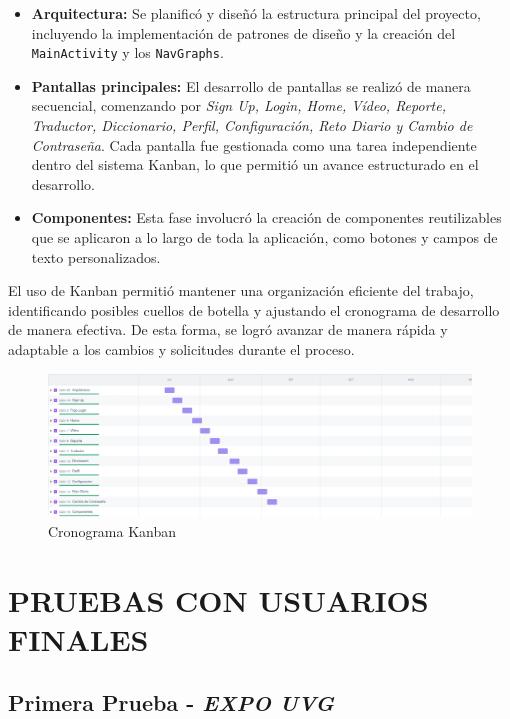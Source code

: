 \begin{itemize}
    \item \textbf{Arquitectura:} Se planificó y diseñó la estructura principal del proyecto, incluyendo la implementación de patrones de diseño y la creación del \texttt{MainActivity} y los \texttt{NavGraphs}.
    \item \textbf{Pantallas principales:} El desarrollo de pantallas se realizó de manera secuencial, comenzando por\textit{ Sign Up, Login, Home, Vídeo, Reporte, Traductor, Diccionario, Perfil, Configuración, Reto Diario y Cambio de Contraseña}. Cada pantalla fue gestionada como una tarea independiente dentro del sistema Kanban, lo que permitió un avance estructurado en el desarrollo.
    \item \textbf{Componentes:} Esta fase involucró la creación de componentes reutilizables que se aplicaron a lo largo de toda la aplicación, como botones y campos de texto personalizados.
\end{itemize}

El uso de Kanban permitió mantener una organización eficiente del trabajo, identificando posibles cuellos de botella y ajustando el cronograma de desarrollo de manera efectiva. De esta forma, se logró avanzar de manera rápida y adaptable a los cambios y solicitudes durante el proceso.

\begin{figure} [H]
    \centering
    \includegraphics[width=1\linewidth]{figuras/kanban.png}
    \caption{Cronograma Kanban}
    \label{fig:enter-label}
\end{figure}




\section{PRUEBAS CON USUARIOS FINALES}


\subsection{Primera Prueba - \textit{EXPO UVG}}

